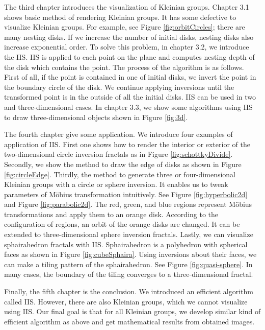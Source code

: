 \documentclass[uplatex, dvipdfmx]{article}
\begin{document}
The third chapter introduces the visualization of Kleinian groups.
Chapter 3.1 shows basic method of rendering Kleinian groups.
It has some defective to visualize Kleinian groups.
For example, see Figure \ref{fig:orbitCircles}; there are many nesting
disks. If we increase the number of initial disks, nesting disks also
increase exponential order.
To solve this problem, in chapter 3.2, we introduce the IIS.
IIS is applied to each point on the plane and computes nesting depth of
the disk which contains the point.
The process of the algorithm is as follows.
First of all, if the point is contained in one of initial disks, we invert the
point in the boundary circle of the disk.
We continue applying inversions until the transformed point is in the
outside of all the initial disks.
IIS can be used in two and three-dimensional cases.
In chapter 3.3, we show some algorithms using IIS to draw three-dimensional
objects shown in Figure \ref{fig:3d}.

The fourth chapter give some application.
We introduce four examples of application of IIS.
First one shows how to render the interior or exterior of the
two-dimensional circle inversion fractals as in Figure \ref{fig:schottkyDivide}.
Secondly, we show the method to draw the edge of disks as shown in
Figure \ref{fig:circleEdge}.
Thirdly, the method to generate three or four-dimensional Kleinian groups with
a circle or sphere inversion. It enables us to tweak parameters of M\"obius
transformation intuitively.
See Figure \ref{fig:hyperbolic2d} and Figure \ref{fig:parabolic2d}.
The red, green, and blue regions represent M\"obius transformations and
apply them to an orange disk.
According to the configuration of regions, an orbit of the orange disks are
changed.
It can be extended to three-dimensional sphere inversion fractals.
Lastly, we can visualize sphairahedron fractals with IIS.
Sphairahedron is a polyhedron with spherical
faces as shown in Figure \ref{fig:cubeSphaira}.
Using inversions about their faces, we can make a tiling pattern
of the sphairahedron. See Figure \ref{fig:quasi-sphere}.
In many cases, the boundary of the tiling converges to a
three-dimensional fractal. 

Finally, the fifth chapter is the conclusion. We introduced an efficient algorithm
called IIS.
However, there are also Kleinian groups, which we cannot
visualize using IIS.
Our final goal is that for all Kleinian groups, we develop similar kind of
efficient algorithm as above and get mathematical results from obtained images.
\end{document}
